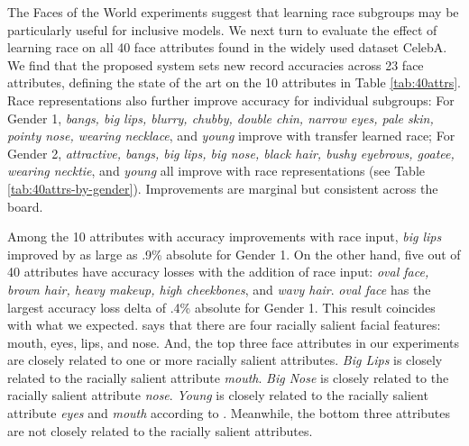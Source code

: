 \documentclass{article}
\begin{document}
The Faces of the World experiments suggest that learning race subgroups may be particularly useful for inclusive models. We next turn to evaluate the effect of learning race on all 40 face attributes found in the widely used dataset CelebA.  We find that the proposed system sets new record accuracies across 23 face attributes, %
defining the state of the art on the 10 attributes in Table \ref{tab:40attrs}. Race representations also further improve accuracy for individual subgroups: For Gender 1, \textit{bangs, big lips, blurry, chubby, double chin, narrow eyes, pale skin, pointy nose, wearing necklace}, and \textit{young} improve with transfer learned race;  For Gender 2, \textit{attractive, bangs, big lips, big nose,
black hair, bushy eyebrows, goatee, wearing necktie}, and \textit{young} all improve with race representations (see Table  \ref{tab:40attrs-by-gender}).  Improvements are marginal but consistent across the board.\vspace{-.2em}

Among the 10 attributes with accuracy improvements with race input,  \textit{big lips} improved by as large as .9\% absolute for Gender 1.  On the other hand, five out of 40 attributes have accuracy losses with the addition of race input: \textit{oval face, brown hair, heavy makeup, high cheekbones}, and \textit{wavy hair}.  \textit{oval face} has the largest accuracy loss delta of .4\% absolute for Gender 1.  This result coincides with what we expected.  \cite{fuetal2014race} says that there are four racially salient facial features: mouth, eyes, lips, and nose.  And, the top three face attributes in our experiments are closely related to one or more racially salient attributes.  \textit{Big Lips} is closely related to the racially salient attribute \textit{mouth}.  \textit{Big Nose} is closely related to the racially salient attribute \textit{nose}.  \textit{Young} is closely related to the racially salient attribute \textit{eyes} and \textit{mouth} according to \cite{young}.  Meanwhile, the bottom three attributes are not closely related to the racially salient attributes.\vspace{-.5em}

\end{document}
